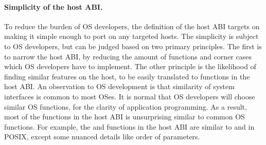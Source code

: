 \paragraph{Simplicity of the host ABI.}
To reduce the burden of OS developers, the definition of the host ABI targets on making it simple enough to port on any targeted hosts.
The simplicity is subject to OS developers,
but can be judged based on two primary principles.
The first is to narrow the host ABI, by reducing the amount of functions and corner cases
which OS developers have to implement.
The other principle is the likelihood of finding similar features on the host, to be easily translated to functions in the host ABI.
An observation to OS development is that similarity of system interfaces is common to most OSes.
It is normal that OS developers will choose similar OS functions, for the clarity of application programming.
As a result, most of the functions in the host ABI is unsurprising similar
to common OS functions. For example, the  and  functions in the host ABI are similar to  and  in POSIX, except some nuanced details like order of parameters.






